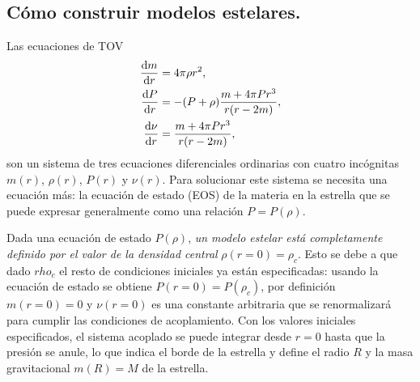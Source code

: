 \subsection{Cómo construir modelos estelares.}\label{SMABC}

\noindent Las ecuaciones de TOV
\begin{align*}
    \dv{m}{r} &= 4\pi \rho r^2, \\
    \dv{P}{r} &= -(P+\rho)\frac{m+4\pi P r^3}{r\qty(r-2m)}, \\
    \dv{\nu}{r} &= \frac{m+4\pi P r^3}{r\qty(r-2m)},
\end{align*}
son un sistema de tres ecuaciones diferenciales ordinarias con cuatro incógnitas $m(r)$, $\rho(r)$, $P(r)$ y $\nu(r)$. Para solucionar este sistema se necesita una ecuación más: la ecuación de estado (EOS) de la materia en la estrella que se puede expresar generalmente como una relación $P=P(\rho)$. 

Dada una ecuación de estado $P(\rho)$, \emph{un modelo estelar está completamente definido por el valor de la densidad central} $\rho(r=0)=\rho_c$. Esto se debe a que dado $rho_c$ el resto de condiciones iniciales ya están especificadas: usando la ecuación de estado se obtiene $P(r=0)=P(\rho_c)$, por definición $m(r=0)=0$ y $\nu(r=0)$ es una constante arbitraria que se renormalizará para cumplir las condiciones de acoplamiento. Con los valores iniciales especificados, el sistema acoplado se puede integrar desde $r=0$ hasta que la presión se anule, lo que indica el borde de la estrella y define el radio $R$ y la masa gravitacional $m(R)=M$ de la estrella. 



